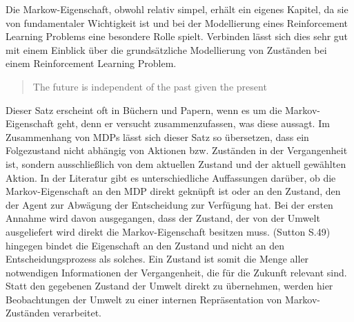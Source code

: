 Die Markow-Eigenschaft, obwohl relativ simpel, erhält ein eigenes Kapitel, da sie von fundamentaler Wichtigkeit ist und bei der Modellierung eines Reinforcement Learning Problems eine besondere Rolle spielt. Verbinden lässt sich dies sehr gut mit einem Einblick über die grundsätzliche Modellierung von Zuständen bei einem Reinforcement Learning Problem.

\begin{quote}
    The future is independent of the past given the present
  \end{quote}

Dieser Satz erscheint oft in Büchern und Papern, wenn es um die Markov-Eigenschaft geht, denn er versucht zusammenzufassen, was diese aussagt. Im Zusammenhang von MDPs lässt sich dieser Satz so übersetzen, dass ein Folgezustand nicht abhängig von Aktionen bzw. Zuständen in der Vergangenheit ist, sondern ausschließlich von dem aktuellen Zustand und der aktuell gewählten Aktion.
In der Literatur gibt es unterschiedliche Auffassungen darüber, ob die Markov-Eigenschaft an den MDP direkt geknüpft ist oder an den Zustand, den der Agent zur Abwägung der Entscheidung zur Verfügung hat. Bei der ersten Annahme wird davon ausgegangen, dass der Zustand, der von der Umwelt ausgeliefert wird direkt die Markov-Eigenschaft besitzen muss. (Sutton S.49) hingegen bindet die Eigenschaft an den Zustand und nicht an den Entscheidungsprozess als solches. Ein Zustand ist somit die Menge aller notwendigen Informationen der Vergangenheit, die für die Zukunft relevant sind. Statt den gegebenen Zustand der Umwelt direkt zu übernehmen, werden hier Beobachtungen der Umwelt zu einer internen Repräsentation von Markov-Zuständen verarbeitet.



